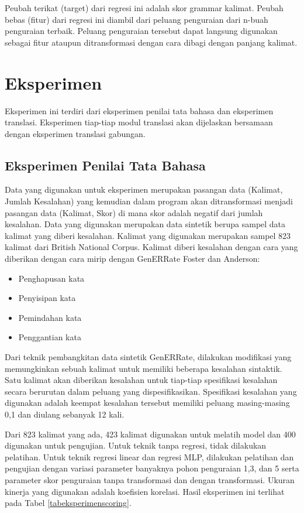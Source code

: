 \documentclass[conference]{IEEEtran}
\begin{document}
Peubah terikat (target) dari regresi ini adalah skor grammar kalimat. Peubah bebas (fitur) dari regresi ini diambil dari peluang penguraian dari n-buah penguraian terbaik. Peluang penguraian tersebut dapat langsung digunakan sebagai fitur ataupun ditransformasi dengan cara dibagi dengan panjang kalimat.

\section{Eksperimen}

Eksperimen ini terdiri dari eksperimen penilai tata bahasa dan eksperimen translasi. Eksperimen tiap-tiap modul translasi akan dijelaskan bersamaan dengan eksperimen translasi gabungan.

\subsection{Eksperimen Penilai Tata Bahasa}

Data yang digunakan untuk eksperimen merupakan pasangan data (Kalimat, Jumlah Kesalahan) yang kemudian dalam program akan ditransformasi menjadi pasangan data (Kalimat, Skor) di mana skor adalah negatif dari jumlah kesalahan. 
Data yang digunakan merupakan data sintetik berupa sampel data kalimat yang diberi kesalahan. Kalimat yang digunakan merupakan sampel 823 kalimat dari British National Corpus\cite{b9}. Kalimat diberi kesalahan dengan cara yang diberikan dengan cara mirip dengan GenERRate Foster dan Anderson\cite{b10}:
\begin{itemize}
\item Penghapusan kata
\item Penyisipan kata
\item Pemindahan kata
\item Penggantian kata
\end{itemize}
Dari teknik pembangkitan data sintetik GenERRate\cite{b10}, dilakukan modifikasi yang memungkinkan sebuah kalimat untuk memiliki beberapa kesalahan sintaktik. Satu kalimat akan diberikan kesalahan untuk tiap-tiap spesifikasi kesalahan secara berurutan dalam peluang yang dispesifikasikan. Spesifikasi kesalahan yang digunakan adalah keempat kesalahan tersebut memiliki peluang masing-masing 0,1 dan diulang sebanyak 12 kali.

Dari 823 kalimat yang ada, 423 kalimat digunakan untuk melatih model dan 400 digunakan untuk pengujian. Untuk teknik tanpa regresi, tidak dilakukan pelatihan. Untuk teknik regresi linear dan regresi MLP, dilakukan pelatihan dan pengujian dengan variasi parameter banyaknya pohon penguraian 1,3, dan 5 serta parameter skor penguraian tanpa transformasi dan dengan transformasi. Ukuran kinerja yang digunakan adalah koefisien korelasi. Hasil eksperimen ini terlihat pada Tabel \ref{tabeksperimenscoring}.
\end{document}

